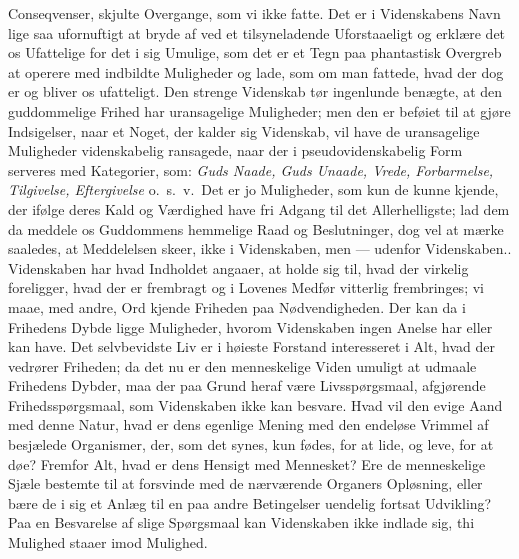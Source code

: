 \documentclass[12pt]{article}
\newcommand{\opage}[1]{\marginnote{\footnotesize\textit{[#1]}}}
\begin{document}
{Conseqvenser, skjulte Overgange, som vi ikke fatte. Det er i
Videnskabens Navn lige saa ufornuftigt at bryde af ved et
tilsyneladende Uforstaaeligt og erklære det os Ufattelige for det i sig
Umulige, som det er et Tegn paa phantastisk Overgreb at operere med
indbildte Muligheder og lade, som om man fattede, hvad der dog er og
bliver os ufatteligt. Den strenge Videnskab tør ingenlunde benægte, at
den guddommelige Frihed har uransagelige Muligheder; men den er beføiet
til at gjøre Indsigelser, naar et Noget, der kalder sig Videnskab, vil
have de uransagelige Muligheder videnskabelig ransagede, naar der i
pseudovidenskabelig Form serveres med Kategorier, som: \emph{Guds
Naade, Guds Unaade, Vrede, Forbarmelse, Tilgivelse, Eftergivelse} o.\
s.\ v.\ Det er jo Muligheder, som kun de kunne kjende, der ifølge deres
Kald og Værdighed have fri Adgang til det Allerhelligste; lad dem da
meddele os Guddommens hemmelige Raad og Beslutninger, dog vel at mærke
saaledes, at Meddelelsen skeer, ikke i Videnskaben, men --- udenfor
Videnskaben.}. Videnskaben har hvad Indholdet
\opage{67} angaaer, at holde sig til, hvad der virkelig foreligger, hvad der er
frembragt og i Lovenes Medfør vitterlig frembringes; vi maae,
\opage{68} med andre, Ord kjende Friheden paa Nødvendigheden. Der kan da i
Frihedens Dybde ligge Muligheder, hvorom Videnskaben ingen Anelse har
eller kan have. Det selvbevidste Liv er i høieste Forstand interesseret
i Alt, hvad der vedrører Friheden; da det nu er den menneskelige Viden
umuligt at udmaale Frihedens Dybder, maa der paa Grund heraf være
Livsspørgsmaal, afgjørende Frihedsspørgsmaal, som Videnskaben ikke kan
besvare. Hvad vil den evige Aand med denne Natur, hvad er
\opage{69} dens egenlige Mening med den endeløse Vrimmel af besjælede Organismer,
der, som det synes, kun fødes, for at lide, og leve, for at døe?
Fremfor Alt, hvad er dens Hensigt med Mennesket? Ere de menneskelige
Sjæle bestemte til at forsvinde med de nærværende Organers Opløsning,
eller bære de i sig et Anlæg til en paa andre Betingelser uendelig
fortsat Udvikling? Paa en Besvarelse af slige Spørgsmaal kan
Videnskaben ikke indlade sig, thi Mulighed staaer imod Mulighed.
\end{document}
